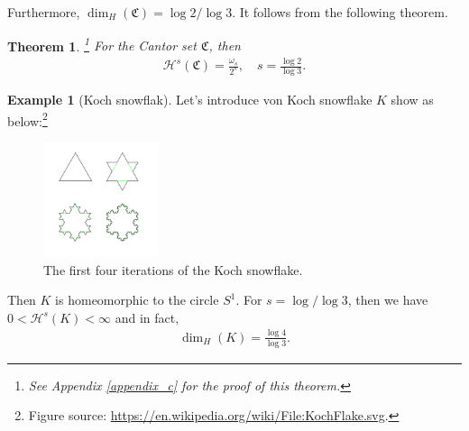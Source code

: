 \documentclass[11pt]{book}
\newtheorem{theorem}{Theorem}[chapter]
\theoremstyle{definition}
\newtheorem{example}{Example}[chapter]
\numberwithin{equation}{chapter}
\def\CC{\mathfrak{C}}
\def\H{{\mathcal H}}
\begin{document}
\medskip

Furthermore, $\dim_{H}(\CC) = \log 2/\log 3$. It follows from the following theorem.

\medskip

\begin{theorem}\footnote{See Appendix \ref{appendix_c} for the proof of this theorem.}
For the Cantor set $\CC$, then
\begin{align*}
    \H^s(\CC) = \frac{\omega_s}{2^s}, \quad s = \frac{\log 2}{\log 3}.
\end{align*}
\end{theorem}

\medskip

\begin{example}[Koch snowflak]
Let's introduce von Koch snowflake $K$ show as below:\footnote{Figure source: \url{https://en.wikipedia.org/wiki/File:KochFlake.svg}.}
\begin{figure}[H]
    \centering
    \includegraphics[width=0.3\textwidth]{KochFlake}
    \caption{The first four iterations of the Koch snowflake.}
    \label{fig:koch_snowflake}
\end{figure}

Then $K$ is homeomorphic to the circle $S^1$. For $s = \log/\log 3$, then we have $0 < \H^s(K) < \infty$ and in fact,
\begin{align*}
    \dim_{H}(K) = \frac{\log 4}{\log 3}.
\end{align*}
\end{example}

\medskip
\end{document}
